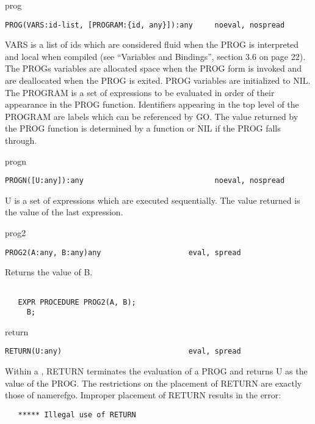 \begin{Function}{prog}
\begin{verbatim}
PROG(VARS:id-list, [PROGRAM:{id, any}]):any     noeval, nospread
\end{verbatim}
   VARS  is a  list of  ids which  are considered fluid  when the
   PROG  is interpreted and local  when compiled (see ``Variables
   and  Bindings'', section 3.6 on page 22).  The PROGs variables
   are  allocated space  when the  PROG form  is invoked  and are
   deallocated  when  the PROG  is exited.    PROG  variables are
   initialized  to NIL. The PROGRAM is a set of expressions to be
   evaluated  in order of their  appearance in the PROG function.
   Identifiers  appearing  in the  top level  of the  PROGRAM are
   labels  which can be  referenced by GO.  The value returned by
   the  PROG function is  determined by a   function or NIL
   if the PROG falls through.

\end{Function}
\begin{Function}{progn}
\begin{verbatim}
PROGN([U:any]):any                              noeval, nospread
\end{verbatim}
   U  is a  set of  expressions which  are executed sequentially.
   The value returned is the value of the last expression.
\end{Function}
\begin{Function}{prog2}
\begin{verbatim}
PROG2(A:any, B:any)any                    eval, spread
\end{verbatim}
   Returns the value of B.
\begin{verbatim}

   EXPR PROCEDURE PROG2(A, B);
     B;
\end{verbatim}
\end{Function}
\begin{Function}{return}
\begin{verbatim}
RETURN(U:any)                             eval, spread
\end{verbatim}
   Within  a  , RETURN  terminates the  evaluation of  a PROG
   and  returns U as  the value of the  PROG. The restrictions on
   the  placement  of RETURN  are exactly  those of nameref{go}. Improper
   placement of RETURN results in the error:
\begin{verbatim}
   ***** Illegal use of RETURN
\end{verbatim}
\end{Function}


